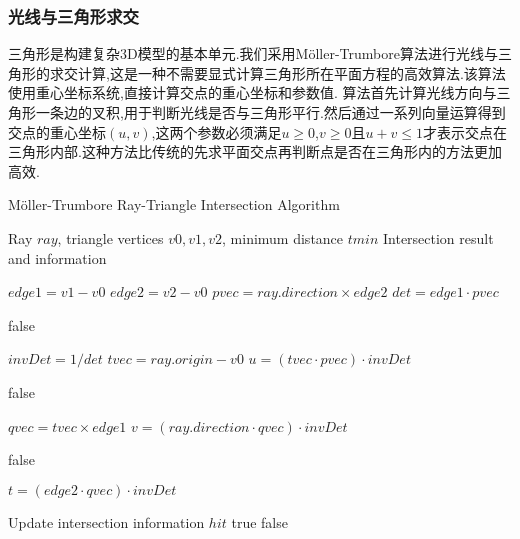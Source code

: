 \documentclass[a4paper,twoside]{article}
\begin{document}
\subsubsection{光线与三角形求交}
三角形是构建复杂3D模型的基本单元.我们采用Möller-Trumbore算法进行光线与三角形的求交计算,这是一种不需要显式计算三角形所在平面方程的高效算法.该算法使用重心坐标系统,直接计算交点的重心坐标和参数值.
算法首先计算光线方向与三角形一条边的叉积,用于判断光线是否与三角形平行.然后通过一系列向量运算得到交点的重心坐标$(u,v)$,这两个参数必须满足$u \geq 0$,$v \geq 0$且$u + v \leq 1$才表示交点在三角形内部.这种方法比传统的先求平面交点再判断点是否在三角形内的方法更加高效.
\begin{algorithm}[H]
    \caption{Möller-Trumbore Ray-Triangle Intersection Algorithm}
    \label{alg:ray_triangle}
    \begin{algorithmic}[1]
        \REQUIRE Ray $ray$, triangle vertices $v0, v1, v2$, minimum distance $tmin$
        \ENSURE Intersection result and information
        
        \STATE $edge1 = v1 - v0$ $edge2 = v2 - v0$
        \STATE $pvec = ray.direction \times edge2$ $det = edge1 \cdot pvec$
        
            \RETURN false 
        \ENDIF
        
        \STATE $invDet = 1 / det$
        \STATE $tvec = ray.origin - v0$
        \STATE $u = (tvec \cdot pvec) \cdot invDet$
        
            \RETURN false
        \ENDIF
        
        \STATE $qvec = tvec \times edge1$
        \STATE $v = (ray.direction \cdot qvec) \cdot invDet$
        
            \RETURN false
        \ENDIF
        
        \STATE $t = (edge2 \cdot qvec) \cdot invDet$
        
            \STATE Update intersection information $hit$
            \RETURN true
        \ELSE
            \RETURN false
        \ENDIF
    \end{algorithmic}
\end{algorithm}
\end{document}
